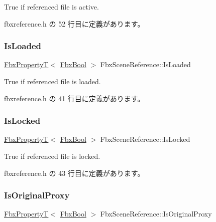 {\ttfamily True} if referenced file is active. 



 fbxreference.\+h の 52 行目に定義があります。

\mbox{\label{class_fbx_scene_reference_a971731e9c034714443001ee94de52562}} 
\subsubsection{\texorpdfstring{Is\+Loaded}{IsLoaded}}
{\footnotesize\ttfamily \hyperlink{class_fbx_property_t}{Fbx\+PropertyT}$<$ \hyperlink{fbxtypes_8h_a92e0562b2fe33e76a242f498b362262e}{Fbx\+Bool} $>$ Fbx\+Scene\+Reference\+::\+Is\+Loaded}



{\ttfamily True} if referenced file is loaded. 



 fbxreference.\+h の 41 行目に定義があります。

\mbox{\label{class_fbx_scene_reference_a5b7de2086b4f2999c7473329e8887168}} 
\subsubsection{\texorpdfstring{Is\+Locked}{IsLocked}}
{\footnotesize\ttfamily \hyperlink{class_fbx_property_t}{Fbx\+PropertyT}$<$ \hyperlink{fbxtypes_8h_a92e0562b2fe33e76a242f498b362262e}{Fbx\+Bool} $>$ Fbx\+Scene\+Reference\+::\+Is\+Locked}



{\ttfamily True} if referenced file is locked. 



 fbxreference.\+h の 43 行目に定義があります。

\mbox{\label{class_fbx_scene_reference_a5bf9c05304a408f9436a0677c3b4acef}} 
\subsubsection{\texorpdfstring{Is\+Original\+Proxy}{IsOriginalProxy}}
{\footnotesize\ttfamily \hyperlink{class_fbx_property_t}{Fbx\+PropertyT}$<$ \hyperlink{fbxtypes_8h_a92e0562b2fe33e76a242f498b362262e}{Fbx\+Bool} $>$ Fbx\+Scene\+Reference\+::\+Is\+Original\+Proxy}




